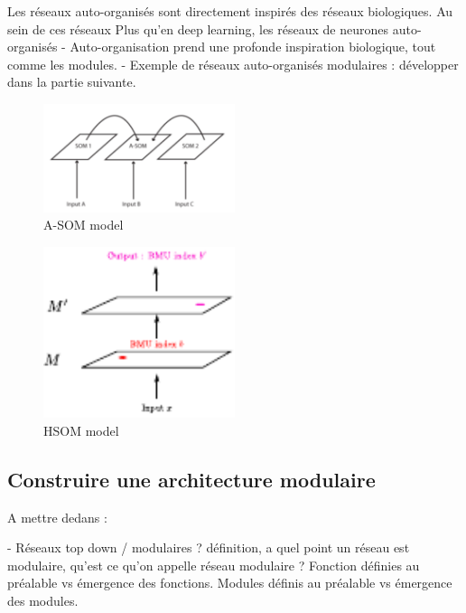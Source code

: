 Les réseaux auto-organisés sont directement inspirés des réseaux biologiques. Au sein de ces réseaux
Plus qu'en deep learning, les réseaux de neurones auto-organisés
- Auto-organisation prend une profonde inspiration biologique, tout comme les modules.
- Exemple de réseaux auto-organisés modulaires : développer dans la partie suivante.
\begin{figure}
\centering
\includegraphics[width=0.5\textwidth]{asom}
\caption{A-SOM model \cite{johnsson_associative_2009}}
\end{figure}
\begin{figure}
\centering
\includegraphics[width=0.5\textwidth]{hsom}
\caption{HSOM model \cite{LampinenClusteringPO}}
\end{figure}


\cite{LampinenClusteringPO}
\cite{parisiLL}

\subsection{Construire une architecture modulaire}

A mettre dedans : 

- Réseaux top down / modulaires ? définition, a quel point un réseau est modulaire, qu'est ce qu'on appelle réseau modulaire ? 
Fonction définies au préalable vs émergence des fonctions. 
Modules définis au préalable vs émergence des modules. 




